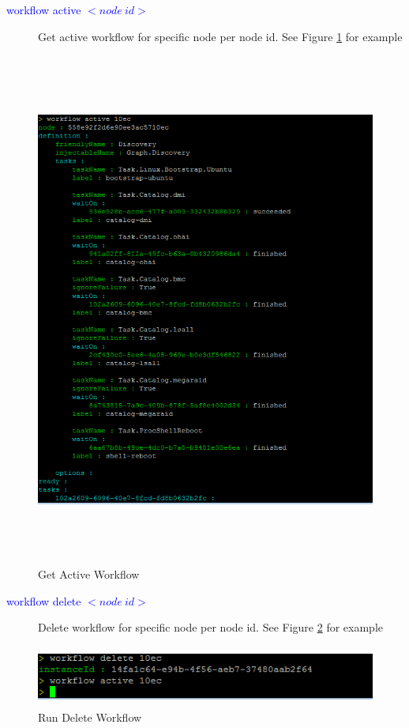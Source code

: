 \documentclass [12pt, a4paper, titlepage]{article}
\begin{document}
        \begin{description}
            \item[\textcolor{blue}{workflow active $<node\ id>$}] Get active workflow for specific node per node id. See Figure \ref{workflows4} for example
        \end{description}
        \begin{figure}[H]
        \begin{center}
        \includegraphics[width=14cm,height=17cm]{png/workflows4.png}
        \end{center}
        \caption{Get Active Workflow}
        \label{workflows4}
        \end{figure}


        \begin{description}
            \item[\textcolor{blue}{workflow delete $<node\ id>$}] Delete workflow for specific node per node id. See Figure \ref{workflows5} for example
        \end{description}
        \begin{figure}[H]
        \begin{center}
        \includegraphics[width=13cm,height=2cm]{png/workflows5.png}
        \end{center}
        \caption{Run Delete Workflow}
        \label{workflows5}
        \end{figure}
\end{document}
